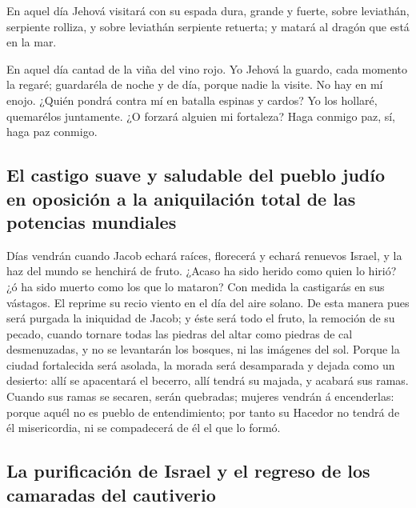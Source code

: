  En aquel día Jehová visitará con su espada dura, grande y
fuerte, sobre leviathán, serpiente rolliza, y sobre leviathán serpiente
retuerta; y matará al dragón que está en la mar.

 En aquel día cantad de la viña del vino rojo. 
Yo Jehová la guardo, cada momento la regaré; guardaréla de noche y de
día, porque nadie la visite.  No hay en mí enojo. ¿Quién
pondrá contra mí en batalla espinas y cardos? Yo los hollaré, quemarélos
juntamente.  ¿O forzará alguien mi fortaleza? Haga conmigo
paz, sí, haga paz conmigo.

\hypertarget{el-castigo-suave-y-saludable-del-pueblo-juduxedo-en-oposiciuxf3n-a-la-aniquilaciuxf3n-total-de-las-potencias-mundiales}{%
\subsection{El castigo suave y saludable del pueblo judío en oposición a
la aniquilación total de las potencias
mundiales}\label{el-castigo-suave-y-saludable-del-pueblo-juduxedo-en-oposiciuxf3n-a-la-aniquilaciuxf3n-total-de-las-potencias-mundiales}}

 Días vendrán cuando Jacob echará raíces, florecerá y echará
renuevos Israel, y la haz del mundo se henchirá de fruto. 
¿Acaso ha sido herido como quien lo hirió? ¿ó ha sido muerto como los
que lo mataron?  Con medida la castigarás en sus vástagos.
El reprime su recio viento en el día del aire solano.  De
esta manera pues será purgada la iniquidad de Jacob; y éste será todo el
fruto, la remoción de su pecado, cuando tornare todas las piedras del
altar como piedras de cal desmenuzadas, y no se levantarán los bosques,
ni las imágenes del sol.  Porque la ciudad fortalecida será
asolada, la morada será desamparada y dejada como un desierto: allí se
apacentará el becerro, allí tendrá su majada, y acabará sus ramas.
 Cuando sus ramas se secaren, serán quebradas; mujeres
vendrán á encenderlas: porque aquél no es pueblo de entendimiento; por
tanto su Hacedor no tendrá de él misericordia, ni se compadecerá de él
el que lo formó.

\hypertarget{la-purificaciuxf3n-de-israel-y-el-regreso-de-los-camaradas-del-cautiverio}{%
\subsection{La purificación de Israel y el regreso de los camaradas del
cautiverio}\label{la-purificaciuxf3n-de-israel-y-el-regreso-de-los-camaradas-del-cautiverio}}

